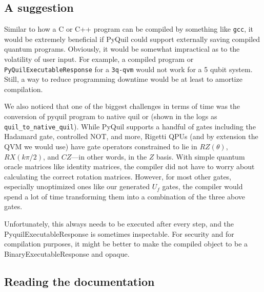 \documentclass[12pt]{article}
\begin{document}

\subsection{A suggestion}

Similar to how a C or C++ program can be compiled by something like \texttt{gcc}, it would be extremely beneficial if PyQuil could support externally saving compiled quantum programs.
Obviously, it would be somewhat impractical as to the volatility of user input.
For example, a compiled program or \texttt{PyQuilExecutableResponse} for a \texttt{3q-qvm} would not work for a 5 qubit system.
Still, a way to reduce programming downtime would be at least to amortize compilation.

We also noticed that one of the biggest challenges in terms of time was the conversion of pyquil program to native quil or (shown in the logs as \texttt{quil\_to\_native\_quil}).
While PyQuil supports a handful of gates including the Hadamard gate, controlled NOT, and more, Rigetti QPUs (and by extension the QVM we would use) have gate operators constrained to lie in $RZ(\theta)$, $RX(k\pi/2)$, and $CZ$---in other words, in the $Z$ basis.
With simple quantum oracle matrices like identity matrices, the compiler did not have to worry about calculating the correct rotation matrices.
However, for most other gates, especially unoptimized ones like our generated $U_f$ gates, the compiler would spend a lot of time transforming them into a combination of the three above gates.

Unfortunately, this always needs to be executed after every step, and the PyquilExecutableResponse is sometimes inspectable.
For security and for compilation purposes, it might be better to make the compiled object to be a BinaryExecutableResponse and opaque.

\subsection{Reading the documentation}
\end{document}
